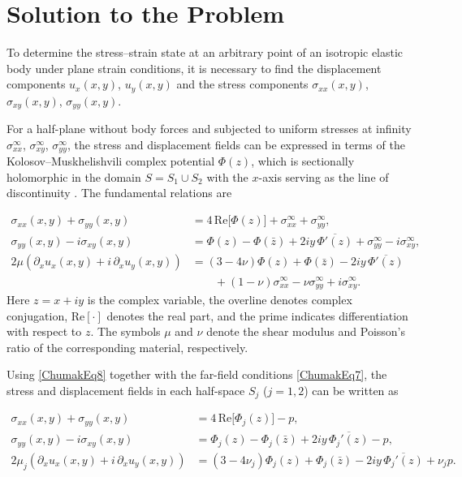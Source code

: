 \section{Solution to the Problem}

To determine the stress–strain state at an arbitrary point of an isotropic elastic body under plane strain conditions, it is necessary to find the displacement components $u_x(x,y)$, $u_y(x,y)$ and the stress components $\sigma_{xx}(x,y)$, $\sigma_{xy}(x,y)$, $\sigma_{yy}(x,y)$.

For a half-plane without body forces and subjected to uniform stresses at infinity $\sigma_{xx}^{\infty}$, $\sigma_{xy}^{\infty}$, $\sigma_{yy}^{\infty}$, the stress and displacement fields can be expressed in terms of the Kolosov–Muskhelishvili complex potential $\Phi(z)$, which is sectionally holomorphic in the domain $S = S_{1} \cup S_{2}$ with the $x$-axis serving as the line of discontinuity \cite{Chumak35}. The fundamental relations are

\begin{equation}
	\label{ChumakEq8}
	\begin{aligned}
		\sigma_{xx}(x,y) + \sigma_{yy}(x,y)
		&= 4\,\mathrm{Re}\bigl[\Phi(z)\bigr]
		+ \sigma_{xx}^{\infty} + \sigma_{yy}^{\infty}, \\
		\sigma_{yy}(x,y) - i\sigma_{xy}(x,y)
		&= \Phi(z) - \Phi(\bar{z})
		+ 2iy\,\overline{\Phi'(z)}
		+ \sigma_{yy}^{\infty} - i\sigma_{xy}^{\infty}, \\
		2\mu \left( \partial_x u_x(x,y) + i\,\partial_x u_y(x,y) \right)
		&= (3 - 4\nu)\Phi(z)
		+ \Phi(\bar{z})
		- 2iy\,\overline{\Phi'(z)} \\
		&\qquad
		+ (1-\nu)\sigma_{xx}^{\infty}
		- \nu\sigma_{yy}^{\infty}
		+ i\sigma_{xy}^{\infty}.
	\end{aligned}
\end{equation}
%
Here $z = x + iy$ is the complex variable, the overline denotes complex conjugation, $\mathrm{Re}[\cdot]$ denotes the real part, and the prime indicates differentiation with respect to $z$. The symbols $\mu$ and $\nu$ denote the shear modulus and Poisson’s ratio of the corresponding material, respectively.

Using \eqref{ChumakEq8} together with the far-field conditions \eqref{ChumakEq7}, the stress and displacement fields in each half-space $S_j$ ($j=1,2$) can be written as

\begin{align}
	\label{ChumakEq9}
	\sigma_{xx}(x,y) + \sigma_{yy}(x,y)
	&= 4\,\mathrm{Re}\bigl[\Phi_j(z)\bigr] - p, \\[4pt]
	\label{ChumakEq10}
	\sigma_{yy}(x,y) - i\sigma_{xy}(x,y)
	&= \Phi_j(z) - \Phi_j(\bar{z})
	+ 2iy\,\overline{\Phi_j'(z)} - p, \\[4pt]
	\label{ChumakEq11}
	2\mu_j \left( \partial_x u_x(x,y)
	+ i\,\partial_x u_y(x,y) \right)
	&= (3 - 4\nu_j)\Phi_j(z)
	+ \Phi_j(\bar{z})
	- 2iy\,\overline{\Phi_j'(z)}
	+ \nu_j p.
\end{align}

